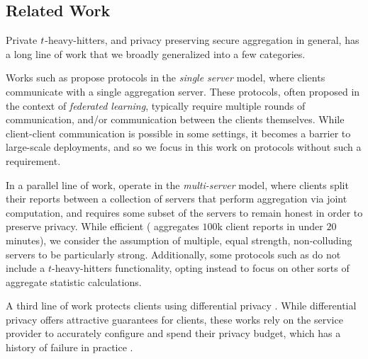 \subsection{Related Work}

Private $t$-heavy-hitters, and privacy preserving secure aggregation in general, has a long line of work that we broadly generalized into a few categories.

Works such as \cite{CCS:BBGLR20, SP:LBVKH23, CCS:BIKMMP17, AC:LLPT23, SP:MWAPR23, ASIACCS:BSHV23, USENIX:BGLLMR23,C:KarPol25} propose protocols in the \emph{single server} model, where clients communicate with a single aggregation server.
These protocols, often proposed in the context of \emph{federated learning}, typically require multiple rounds of communication, and/or communication between the clients themselves.
While client-client communication is possible in some settings, it becomes a barrier to large-scale deployments, and so we focus in this work on protocols without such a requirement.


In a parallel line of work, \cite{EPRINT:DPRS23, prio, SCN:AGJOP22, EPRINT:BanCheVen24, PoPETS:MouSarTso24, PoPETS:MPDST25, SP:BBCGI21, EPRINT:BBCGKR24, zhu2020federated, SP:RSWP23} operate in the \emph{multi-server} model, where clients split their reports between a collection of servers that perform aggregation via joint computation, and requires some subset of the servers to remain honest in order to preserve privacy.
While efficient (\cite{PoPETS:MPDST25} aggregates $100$k client reports in under $20$ minutes), we consider the assumption of multiple, equal strength, non-colluding servers to be particularly strong.
Additionally, some protocols such as \cite{SCN:AGJOP22} do not include a $t$-heavy-hitters functionality, opting instead to focus on other sorts of aggregate statistic calculations.


A third line of work \cite{bittau2017prochlo, bassily2017practical, STOC:BasSmi15, bun2019heavy, CCS:QYYKXR16} protects clients using differential privacy \autocite{TCC:DMNS06}.
While differential privacy offers attractive guarantees for clients, these works rely on the service provider to accurately configure and spend their privacy budget, which has a history of failure in practice \autocite{tang2017privacy}.


